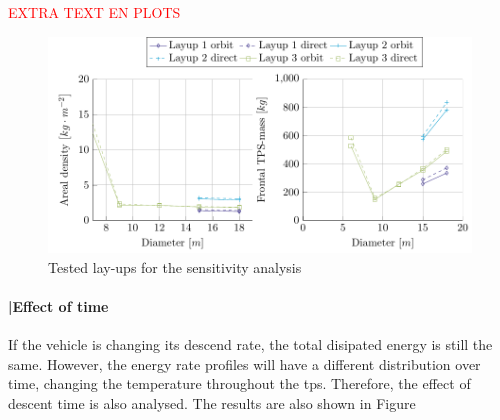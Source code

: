 \textcolor{red}{EXTRA TEXT EN PLOTS}
\begin{figure}[ht]
	\centering
	\includegraphics{./Figure/Thermal/SensitivityA.pdf}
	\caption{Tested lay-ups for the sensitivity analysis}
	\label{fig:sensitivityA}
\end{figure}

\paragraph{|Effect of time}
If the vehicle is changing its descend rate, the total disipated energy is still the same. However, the energy rate profiles will have a different distribution over time, changing the temperature throughout the \gls{tps}. Therefore, the effect of descent time is also analysed. The results are also shown in Figure \